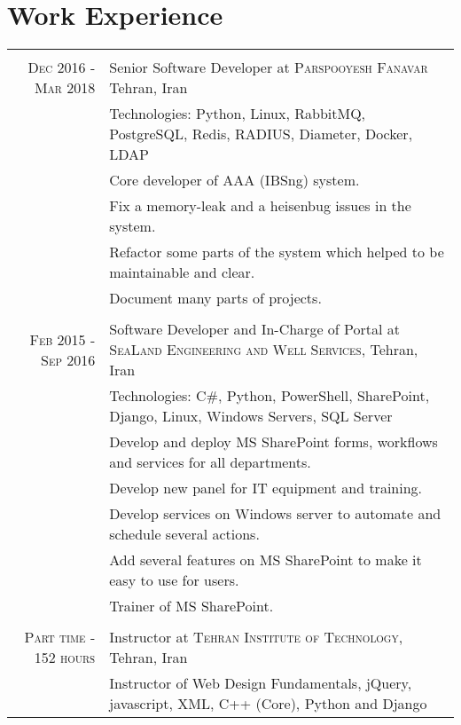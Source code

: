 \documentclass[a4paper,11pt]{article}
\begin{document}
\section{Work Experience}
\begin{tabular}{r|p{11cm}}

    \multicolumn{2}{c}{}\\
    \textsc{Dec 2016 - Mar 2018}
    & Senior Software Developer at \textsc{Parspooyesh Fanavar}
    Tehran, Iran\\
    &\footnotesize{Technologies: Python, Linux, RabbitMQ, PostgreSQL, Redis, RADIUS, Diameter, Docker, LDAP}\\
    &\footnotesize{Core developer of AAA (IBSng) system.}\\
    &\footnotesize{Fix a memory-leak and a heisenbug issues in the system.}\\
    &\footnotesize{Refactor some parts of the system which helped to be maintainable and clear.}\\
    &\footnotesize{Document many parts of projects.}\\

    \multicolumn{2}{c}{}\\
    \textsc{Feb 2015 - Sep 2016}
    & Software Developer and In-Charge of Portal at \textsc{SeaLand Engineering and Well Services},
    Tehran, Iran\\
    &\footnotesize{Technologies: C\#, Python, PowerShell, SharePoint, Django, Linux,  Windows Servers, SQL Server}\\
    &\footnotesize{Develop and deploy MS SharePoint forms, workflows and services for all departments.}\\
    &\footnotesize{Develop new panel for IT equipment and training.}\\
    &\footnotesize{Develop services on Windows server to automate and schedule several actions.}\\
    &\footnotesize{Add several features on MS SharePoint to make it easy to use for users.}\\
    &\footnotesize{Trainer of MS SharePoint.}\\

    \multicolumn{2}{c}{}\\
    \textsc{Part time - 152 hours}
    & Instructor at \textsc{Tehran Institute of Technology},
    Tehran, Iran\\
    &\footnotesize{Instructor of Web Design Fundamentals, jQuery, javascript, XML, C++ (Core), Python and Django}\\


\end{tabular}
\end{document}
